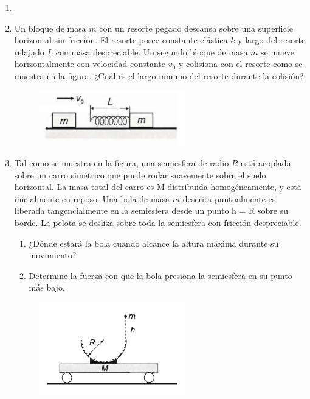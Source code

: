 \documentclass[letterpaper,11pt]{article}
\begin{document}
\vspace{-1cm}
\begin{enumerate}\setlength{\itemsep}{0.4cm}

\item[]

\item Un bloque de masa $m$ con un resorte pegado descansa sobre una superficie horizontal sin fricción. El resorte posee constante elástica $k$ y largo del resorte relajado $L$ con masa despreciable. Un segundo bloque de masa $m$ se mueve horizontalmente con velocidad constante $v_0$ y colisiona con el resorte como se muestra en la figura. ¿Cuál es el largo mínimo del resorte durante la colisión?

\begin{figure}[H]
    \centering
    \includegraphics[width = 0.6\textwidth]{2023-1/img/aux_14/Aux 14 - P1.PNG}
    \label{fig:enter-label}
\end{figure}

\item Tal como se muestra en la figura, una semiesfera de radio $R$ está acoplada sobre un carro simétrico que puede rodar suavemente sobre el suelo horizontal. La masa total del carro es M distribuida homogéneamente, y está inicialmente en reposo. Una bola de masa $m$ descrita puntualmente es liberada tangencialmente en la semiesfera desde un punto h = R sobre su borde. La pelota se desliza sobre toda la semiesfera con fricción despreciable.
\begin{enumerate}
    \item ¿Dónde estará la bola cuando alcance la altura máxima durante su movimiento?
    \item Determine la fuerza con que la bola presiona la semiesfera en su punto más bajo.
\end{enumerate}

\begin{figure}[H]
    \centering
    \includegraphics[width = 0.6\textwidth]{2023-1/img/aux_14/Aux 14 - P2.PNG}
    \label{fig:enter-label}
\end{figure}


\end{enumerate}
\end{document}
